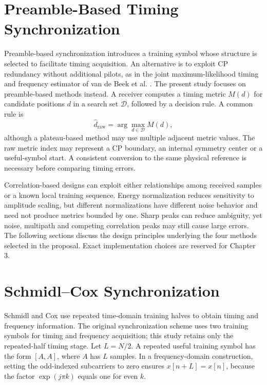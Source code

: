 \section{Preamble-Based Timing Synchronization}
Preamble-based synchronization introduces a training symbol whose structure is selected to facilitate timing acquisition. An alternative is to exploit CP redundancy without additional pilots, as in the joint maximum-likelihood timing and frequency estimator of van de Beek et al. \cite{vandebeek1997}. The present study focuses on preamble-based methods instead. A receiver computes a timing metric $M(d)$ for candidate positions $d$ in a search set $\mathcal{D}$, followed by a decision rule. A common rule is
\begin{equation}
 \widehat d_{\mathrm{raw}}=\arg\max_{d\in\mathcal{D}}M(d),
\end{equation}
although a plateau-based method may use multiple adjacent metric values. The raw metric index may represent a CP boundary, an internal symmetry center or a useful-symbol start. A consistent conversion to the same physical reference is necessary before comparing timing errors.

Correlation-based designs can exploit either relationships among received samples or a known local training sequence. Energy normalization reduces sensitivity to amplitude scaling, but different normalizations have different noise behavior and need not produce metrics bounded by one. Sharp peaks can reduce ambiguity, yet noise, multipath and competing correlation peaks may still cause large errors. The following sections discuss the design principles underlying the four methods selected in the proposal. Exact implementation choices are reserved for Chapter 3.

\section{Schmidl--Cox Synchronization}
Schmidl and Cox \cite{schmidl1997} use repeated time-domain training halves to obtain timing and frequency information. The original synchronization scheme uses two training symbols for timing and frequency acquisition; this study retains only the repeated-half timing stage. Let $L=N/2$. A repeated useful training symbol has the form $[A,A]$, where $A$ has $L$ samples. In a frequency-domain construction, setting the odd-indexed subcarriers to zero ensures $x[n+L]=x[n]$, because the factor $\exp(j\pi k)$ equals one for even $k$.


